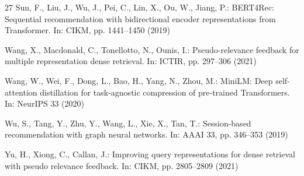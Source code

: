 \documentclass[runningheads]{llncs}
\begin{document}
\begin{thebibliography}{27}
Sun, F., Liu, J., Wu, J., Pei, C., Lin, X., Ou, W., Jiang, P.:
BERT4Rec: Sequential recommendation with bidirectional encoder representations
from Transformer. In: CIKM, pp. 1441--1450 (2019)

Wang, X., Macdonald, C., Tonellotto, N., Ounis, I.:
Pseudo-relevance feedback for multiple representation dense retrieval.
In: ICTIR, pp. 297--306 (2021)

Wang, W., Wei, F., Dong, L., Bao, H., Yang, N., Zhou, M.:
MiniLM: Deep self-attention distillation for task-agnostic compression of
pre-trained Transformers. In: NeurIPS 33 (2020)

Wu, S., Tang, Y., Zhu, Y., Wang, L., Xie, X., Tan, T.:
Session-based recommendation with graph neural networks.
In: AAAI 33, pp. 346--353 (2019)

Yu, H., Xiong, C., Callan, J.:
Improving query representations for dense retrieval with pseudo relevance
feedback. In: CIKM, pp. 2805--2809 (2021)

\end{thebibliography}
\end{document}
